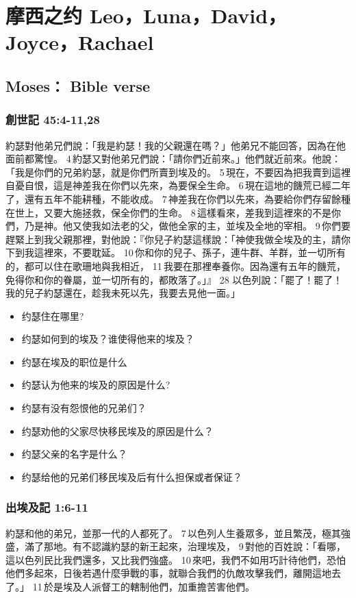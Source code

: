 \chapter{摩西之约 Leo，Luna，David，Joyce，Rachael}

\section{Moses： Bible verse}
\subsection{創世記 45:4-11,28}
約瑟對他弟兄們說：「我是約瑟！我的父親還在嗎？」他弟兄不能回答，因為在他面前都驚惶。 4 約瑟又對他弟兄們說：「請你們近前來。」他們就近前來。他說：「我是你們的兄弟約瑟，就是你們所賣到埃及的。 5 現在，不要因為把我賣到這裡自憂自恨，這是神差我在你們以先來，為要保全生命。 6 現在這地的饑荒已經二年了，還有五年不能耕種，不能收成。 7 神差我在你們以先來，為要給你們存留餘種在世上，又要大施拯救，保全你們的生命。 8 這樣看來，差我到這裡來的不是你們，乃是神。他又使我如法老的父，做他全家的主，並埃及全地的宰相。 9 你們要趕緊上到我父親那裡，對他說：『你兒子約瑟這樣說：「神使我做全埃及的主，請你下到我這裡來，不要耽延。 10 你和你的兒子、孫子，連牛群、羊群，並一切所有的，都可以住在歌珊地與我相近， 11 我要在那裡奉養你。因為還有五年的饑荒，免得你和你的眷屬，並一切所有的，都敗落了。」』
28 以色列說：「罷了！罷了！我的兒子約瑟還在，趁我未死以先，我要去見他一面。」

\begin{itemize}
\item 约瑟住在哪里?
\item 约瑟如何到的埃及？谁使得他来的埃及？
\item 约瑟在埃及的职位是什么
\item 约瑟认为他来的埃及的原因是什么?
\item 约瑟有没有怨恨他的兄弟们？
\item 约瑟劝他的父家尽快移民埃及的原因是什么？
\item 约瑟父亲的名字是什么？
\item 约瑟给他的兄弟们移民埃及后有什么担保或者保证？
\end{itemize}


\subsection{出埃及記 1:6-11}
約瑟和他的弟兄，並那一代的人都死了。 7 以色列人生養眾多，並且繁茂，極其強盛，滿了那地。有不認識約瑟的新王起來，治理埃及， 9 對他的百姓說：「看哪，這以色列民比我們還多，又比我們強盛。 10 來吧，我們不如用巧計待他們，恐怕他們多起來，日後若遇什麼爭戰的事，就聯合我們的仇敵攻擊我們，離開這地去了。」 11 於是埃及人派督工的轄制他們，加重擔苦害他們。


